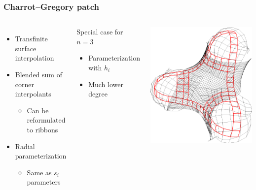 \documentclass[xcolor=table]{beamer}
\begin{document}
\begin{frame}
  \frametitle{Charrot--Gregory patch}
  \begin{columns}
    \begin{itemize}
    \item Transfinite surface interpolation
    \item Blended sum of corner interpolants
      \begin{itemize}
      \item Can be reformulated to ribbons
      \end{itemize}
    \item Radial parameterization
      \begin{itemize}
      \item Same as $s_i$ parameters
      \end{itemize}
    \end{itemize}
    \vfill
    \begin{block}{Special case for $n=3$}
      \begin{itemize}
      \item Parameterization with $h_i$
      \item Much lower degree
      \end{itemize}
    \end{block}
    \includegraphics[width=\textwidth]{images/trebol3-cnet.png}
  \end{columns}
\end{frame}
\end{document}
